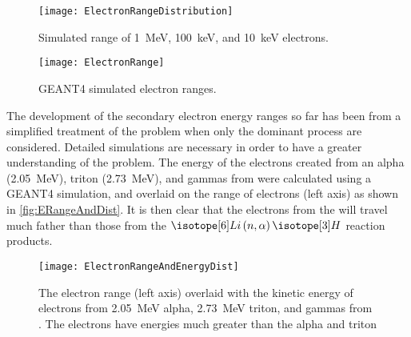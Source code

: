 \begin{figure}
  \centering
      \texttt{[image: ElectronRangeDistribution]}
      \caption[Simulated Electron Ranges Distrubtions in Polystyrene]{Simulated range of \SI{1}{\MeV}, \SI{100}{\keV}, and \SI{10}{\keV} electrons.}
      \label{fig:ElectronRangesDist}
\end{figure}
\begin{figure}
	\centering
      \texttt{[image: ElectronRange]}
  \caption[Simulated Electron Ranges in Polystyrene]{GEANT4 simulated electron ranges.} 
  \label{fig:ElectronRanges}
\end{figure}

The development of the secondary electron energy ranges so far has been from a simplified treatment of the problem when only the dominant process are considered.
Detailed simulations are necessary in order to have a greater understanding of the problem. 
The energy of the electrons created from an alpha (\SI{2.05}{\MeV}), triton (\SI{2.73}{\MeV}), and gammas from  were calculated using a GEANT4 simulation, and overlaid on the range of electrons (left axis) as shown in \autoref{fig:ERangeAndDist}.
It is then clear that the electrons from the  will travel much father than those from the $\iso[6]{Li}\left(n,\alpha\right)\iso[3]{H}$ reaction products.
\begin{figure}
  \centering
  \texttt{[image: ElectronRangeAndEnergyDist]}
  \caption[Electron Range and Energy Distribution of Selected Reactions]{The electron range (left axis) overlaid with the kinetic energy of electrons from \SI{2.05}{\MeV} alpha, \SI{2.73}{\MeV} triton, and gammas from . The  electrons have energies much greater than the alpha and triton}
  \label{fig:ERangeAndDist}
\end{figure}
